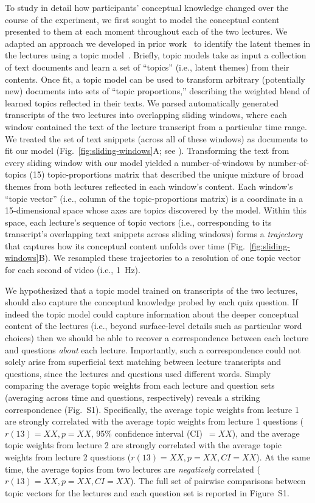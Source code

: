 \documentclass[10pt]{article}
\newcommand{\topicWeights}{S1}
\renewcommand{\nameref}[1]{\mbox{\textit{\oldnameref{#1}}}}
\begin{document}
To study in detail how participants' conceptual knowledge changed over the
course of the experiment, we first sought to model the conceptual content
presented to them at each moment throughout each of the two lectures. We
adapted an approach we developed in prior work~\citep{HeusEtal21} to identify
the latent themes in the lectures using a topic model~\citep{BleiEtal03}.
Briefly, topic models take as input a collection of text documents and learn a
set of ``topics'' (i.e., latent themes) from their contents. Once fit, a topic
model can be used to transform arbitrary (potentially new) documents into sets
of ``topic proportions,'' describing the weighted blend of learned topics
reflected in their texts. We parsed automatically generated transcripts of the
two lectures into overlapping sliding windows, where each window contained the
text of the lecture transcript from a particular time range. We treated the set
of text snippets (across all of these windows) as documents to fit our model
(Fig.~\ref{fig:sliding-windows}A; see \nameref{subsec:topic-modeling}).
Transforming the text from every sliding window with our model yielded a
number-of-windows by number-of-topics (15) topic-proportions matrix that
described the unique mixture of broad themes from both lectures reflected in
each window's content. Each window's ``topic vector'' (i.e., column of the
topic-proportions matrix) is a coordinate in a 15-dimensional space whose axes
are topics discovered by the model. Within this space, each lecture's sequence
of topic vectors (i.e., corresponding to its transcript's overlapping text
snippets across sliding windows) forms a \textit{trajectory} that captures how
its conceptual content unfolds over time (Fig.~\ref{fig:sliding-windows}B). We
resampled these trajectories to a resolution of one topic vector for each
second of video (i.e., 1~Hz).

We hypothesized that a topic model trained on transcripts of the two lectures,
should also capture the conceptual knowledge probed by each quiz question. If
indeed the topic model could capture information about the deeper conceptual
content of the lectures (i.e., beyond surface-level details such as particular
word choices) then we should be able to recover a correspondence between each
lecture and questions \textit{about} each lecture. Importantly, such a
correspondence could not solely arise from superficial text matching between
lecture transcripts and questions, since the lectures and questions used
different words. Simply comparing the average topic weights from each lecture
and question sets (averaging across time and questions, respectively) reveals a
striking correspondence (Fig.~\topicWeights). Specifically, the average topic
weights from lecture 1 are strongly correlated with the average topic weights
from lecture 1 questions ($r(13) = XX, p = XX$, 95\% confidence interval
(CI)~$= XX$), and the average topic weights from lecture 2 are strongly
correlated with the average topic weights from lecture 2 questions ($r(13) =
XX, p = XX, CI = XX$). At the same time, the average topics from two lectures
are \textit{negatively} correlated ($r(13) = XX, p = XX, CI = XX$). The full
set of pairwise comparisons between topic vectors for the lectures and each
question set is reported in Figure~\topicWeights.
\end{document}
